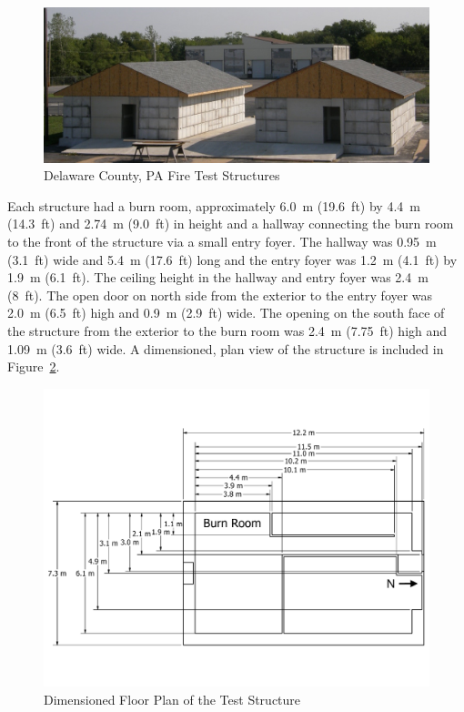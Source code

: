\documentclass[12pt,oneside]{book}
\begin{document}
\begin{figure}[!ht]
	\includegraphics[width=6in]{../Figures/Pictures/DelCo_Structures}
	\caption{Delaware County, PA Fire Test Structures}
	\label{fig:Delaware_County,_PA_Fire_Test_Structures}
\end{figure}

Each structure had a burn room, approximately 6.0~m (19.6~ft) by 4.4~m (14.3~ft) and 2.74~m (9.0~ft) in height and a hallway connecting the burn room to the front of the structure via a small entry foyer. The hallway was 0.95~m (3.1~ft) wide and 5.4~m (17.6~ft) long and the entry foyer was 1.2~m (4.1~ft) by 1.9~m (6.1~ft). The ceiling height in the hallway and entry foyer was 2.4~m (8~ft).  The open door on north side from the exterior to the entry foyer was 2.0~m (6.5~ft) high and 0.9~m (2.9~ft) wide. The opening on the south face of the structure from the exterior to the burn room was 2.4~m (7.75~ft) high and 1.09~m (3.6~ft) wide. A dimensioned, plan view of the structure is included in Figure~\ref{fig:Test_Structure_Floor_Plan}.

\begin{figure}[!ht]
	\includegraphics[width=\columnwidth]{../Figures/Floor_Plans/PDFs/East_Structure/DelCo_2012_East_Structure_Plain}
	\caption{Dimensioned Floor Plan of the Test Structure}
	\label{fig:Test_Structure_Floor_Plan}
\end{figure}
\end{document}
